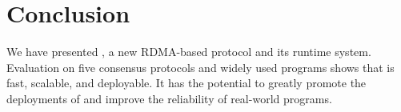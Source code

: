 \section{Conclusion}\label{sec:conclusion}
We have presented \xxx, a new RDMA-based \paxos protocol and its runtime 
system. Evaluation on five consensus protocols and \nprog widely used programs 
shows that \xxx is fast, scalable, and deployable. It has the potential to 
greatly promote the deployments of \paxos and improve the reliability of 
real-world programs.
